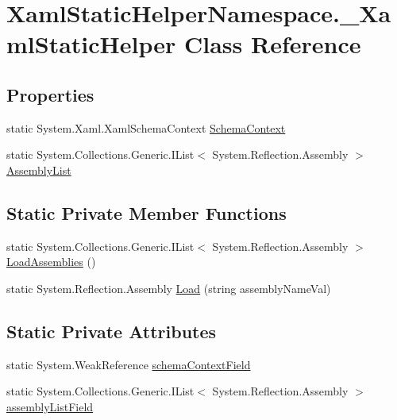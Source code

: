 \hypertarget{class_xaml_static_helper_namespace_1_1___xaml_static_helper}{}\section{Xaml\+Static\+Helper\+Namespace.\+\_\+\+Xaml\+Static\+Helper Class Reference}
\label{class_xaml_static_helper_namespace_1_1___xaml_static_helper}
\subsection*{Properties}
\begin{DoxyCompactItemize}
\item 
static System.\+Xaml.\+Xaml\+Schema\+Context \hyperlink{class_xaml_static_helper_namespace_1_1___xaml_static_helper_a703c877fd6ad70d1add0c1cfda1de3a1}{Schema\+Context}
\item 
static System.\+Collections.\+Generic.\+I\+List$<$ System.\+Reflection.\+Assembly $>$ \hyperlink{class_xaml_static_helper_namespace_1_1___xaml_static_helper_ac4dcc401ff305c0953427d881506455f}{Assembly\+List}
\end{DoxyCompactItemize}
\subsection*{Static Private Member Functions}
\begin{DoxyCompactItemize}
\item 
static System.\+Collections.\+Generic.\+I\+List$<$ System.\+Reflection.\+Assembly $>$ \hyperlink{class_xaml_static_helper_namespace_1_1___xaml_static_helper_a96ab05879687ec30f1c2c505a94802f8}{Load\+Assemblies} ()
\item 
static System.\+Reflection.\+Assembly \hyperlink{class_xaml_static_helper_namespace_1_1___xaml_static_helper_adc04a34bff2e0d36643d52e4521bb26f}{Load} (string assembly\+Name\+Val)
\end{DoxyCompactItemize}
\subsection*{Static Private Attributes}
\begin{DoxyCompactItemize}
\item 
static System.\+Weak\+Reference \hyperlink{class_xaml_static_helper_namespace_1_1___xaml_static_helper_a4a6305e6ff660caf4aea99a620f62961}{schema\+Context\+Field}
\item 
static System.\+Collections.\+Generic.\+I\+List$<$ System.\+Reflection.\+Assembly $>$ \hyperlink{class_xaml_static_helper_namespace_1_1___xaml_static_helper_af8a286a5737de9be9fa52d9a9d957ade}{assembly\+List\+Field}
\end{DoxyCompactItemize}


